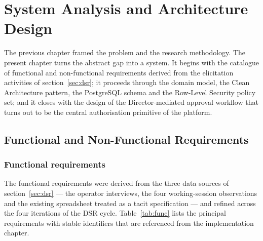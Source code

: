\chapter{System Analysis and Architecture Design}
\label{chap:methodology}

The previous chapter framed the problem and the research methodology. The present chapter turns the abstract gap into a system. It begins with the catalogue of functional and non-functional requirements derived from the elicitation activities of section~\ref{sec:dsr}; it proceeds through the domain model, the Clean Architecture pattern, the PostgreSQL schema and the Row-Level Security policy set; and it closes with the design of the Director-mediated approval workflow that turns out to be the central authorisation primitive of the platform.

\section{Functional and Non-Functional Requirements}
\label{sec:requirements}

\subsection{Functional requirements}
\label{ssec:func}

The functional requirements were derived from the three data sources of section~\ref{sec:dsr} --- the operator interviews, the four working-session observations and the existing spreadsheet treated as a tacit specification --- and refined across the four iterations of the DSR cycle. Table~\ref{tab:func} lists the principal requirements with stable identifiers that are referenced from the implementation chapter.

